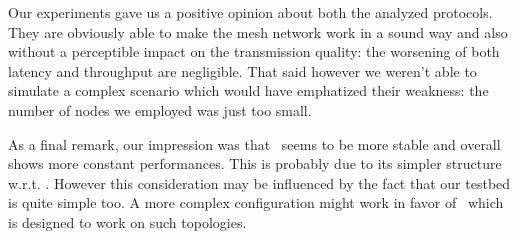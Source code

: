 Our experiments gave us a positive opinion about both the analyzed
protocols. They are obviously able to make the mesh network work in a
sound way and also without a perceptible impact on the transmission
quality: the worsening of both latency and throughput are
negligible. That said however we weren't able to simulate a complex scenario
which would have emphatized their weakness: the number of nodes we
employed was just too small.

As a final remark, our impression was that \batman\ seems to be more
stable and overall shows more constant performances. This is probably
due to its simpler structure w.r.t. \olsr. However this consideration
may be influenced by the fact that our testbed is quite simple too. A
more complex configuration might work in favor of \olsr\ which is
designed to work on such topologies.